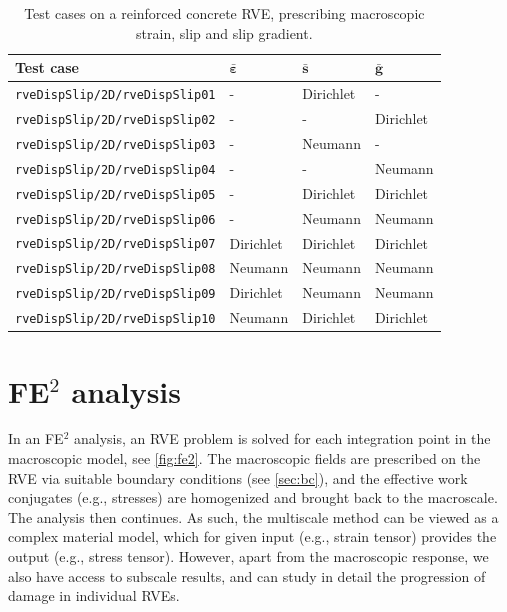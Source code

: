 \documentclass[11pt]{article}
\begin{document}
\begin{table}[H]
    \centering
    \caption{Test cases on a reinforced concrete RVE, prescribing macroscopic strain, slip and slip gradient.}
\begin{tabular}{|l|l|l|l|}
\hline
   Test case      & $\bm{\bar{\varepsilon}}$ & $\bm{\bar{s}}$ & $\bm{\bar{g}}$ \\ \hline
\texttt{rveDispSlip/2D/rveDispSlip01} & -                   & Dirichlet & -         \\ \hline
\texttt{rveDispSlip/2D/rveDispSlip02} & -                   & -         & Dirichlet \\ \hline
\texttt{rveDispSlip/2D/rveDispSlip03} & -                   & Neumann   & -         \\ \hline
\texttt{rveDispSlip/2D/rveDispSlip04} & -                   & -         & Neumann   \\ \hline
\texttt{rveDispSlip/2D/rveDispSlip05} & -                   & Dirichlet & Dirichlet \\ \hline
\texttt{rveDispSlip/2D/rveDispSlip06} & -                   & Neumann   & Neumann   \\ \hline
\texttt{rveDispSlip/2D/rveDispSlip07} & Dirichlet           & Dirichlet & Dirichlet \\ \hline
\texttt{rveDispSlip/2D/rveDispSlip08} & Neumann             & Neumann   & Neumann   \\ \hline
\texttt{rveDispSlip/2D/rveDispSlip09} & Dirichlet           & Neumann   & Neumann   \\ \hline
\texttt{rveDispSlip/2D/rveDispSlip10} & Neumann             & Dirichlet & Dirichlet \\ \hline
\end{tabular}
\label{tab:rveDispSlip}
\end{table}



\clearpage
\section{FE$^2$ analysis}
\label{sec:fe2}

In an FE$^2$ analysis, an RVE problem is solved for each integration point in the macroscopic model, see \cref{fig:fe2}. The macroscopic fields are prescribed on the RVE via suitable boundary conditions (see \cref{sec:bc}), and the effective work conjugates (e.g., stresses) are homogenized and brought back to the macroscale. The analysis then continues. 
As such, the multiscale method can be viewed as a complex material model, which for given input (e.g., strain tensor) provides the output (e.g., stress tensor). 
However, apart from the macroscopic response, we also have access to subscale results, and can study in detail the progression of damage in individual RVEs.
\end{document}
